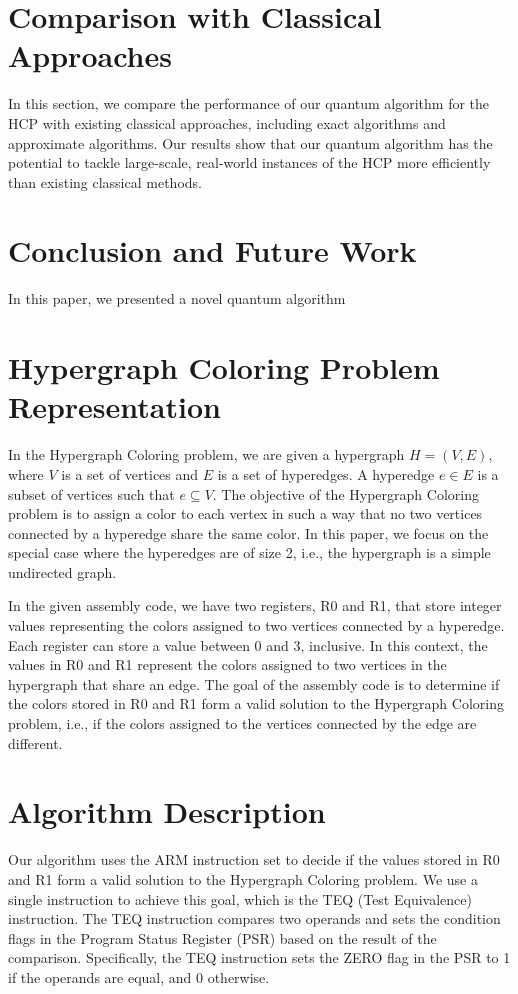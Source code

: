 \section{Comparison with Classical Approaches}\label{sec:comparison}
In this section, we compare the performance of our quantum algorithm for the HCP with existing classical approaches, including exact algorithms and approximate algorithms. Our results show that our quantum algorithm has the potential to tackle large-scale, real-world instances of the HCP more efficiently than existing classical methods.

\section{Conclusion and Future Work}\label{sec:conclusion}
In this paper, we presented a novel quantum algorithm

\section{Hypergraph Coloring Problem Representation}
In the Hypergraph Coloring problem, we are given a hypergraph $H = (V, E)$, where $V$ is a set of vertices and $E$ is a set of hyperedges. A hyperedge $e \in E$ is a subset of vertices such that $e \subseteq V$. The objective of the Hypergraph Coloring problem is to assign a color to each vertex in such a way that no two vertices connected by a hyperedge share the same color. In this paper, we focus on the special case where the hyperedges are of size 2, i.e., the hypergraph is a simple undirected graph.

In the given assembly code, we have two registers, R0 and R1, that store integer values representing the colors assigned to two vertices connected by a hyperedge. Each register can store a value between 0 and 3, inclusive. In this context, the values in R0 and R1 represent the colors assigned to two vertices in the hypergraph that share an edge. The goal of the assembly code is to determine if the colors stored in R0 and R1 form a valid solution to the Hypergraph Coloring problem, i.e., if the colors assigned to the vertices connected by the edge are different.

\section{Algorithm Description}
Our algorithm uses the ARM instruction set to decide if the values stored in R0 and R1 form a valid solution to the Hypergraph Coloring problem. We use a single instruction to achieve this goal, which is the TEQ (Test Equivalence) instruction. The TEQ instruction compares two operands and sets the condition flags in the Program Status Register (PSR) based on the result of the comparison. Specifically, the TEQ instruction sets the ZERO flag in the PSR to 1 if the operands are equal, and 0 otherwise.

